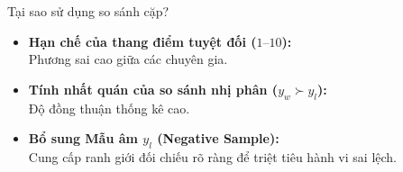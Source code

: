 \begin{frame}{Tại sao sử dụng so sánh cặp?}
  \small
  \begin{itemize}\setlength{\itemsep}{6pt}
    \item \textbf{Hạn chế của thang điểm tuyệt đối ($1\text{--}10$):}\\
      Phương sai cao giữa các chuyên gia.
    \item \textbf{Tính nhất quán của so sánh nhị phân ($y_w \succ y_l$):}\\
      Độ đồng thuận thống kê cao.
    \item \textbf{Bổ sung Mẫu âm $y_l$ (Negative Sample):}\\
      Cung cấp ranh giới đối chiếu rõ ràng để triệt tiêu hành vi sai lệch.
  \end{itemize}
  \par\vspace{0pt}
\end{frame}

